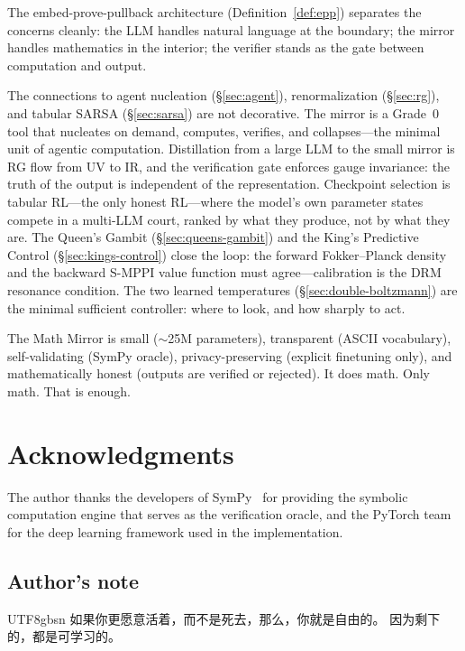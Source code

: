 \documentclass[11pt,a4paper]{article}
\begin{document}
The embed-prove-pullback architecture
(Definition~\ref{def:epp}) separates the concerns cleanly:
the LLM handles natural language at the boundary;
the mirror handles mathematics in the interior;
the verifier stands as the gate between computation and output.

The connections to agent nucleation (\S\ref{sec:agent}),
renormalization (\S\ref{sec:rg}), and tabular SARSA
(\S\ref{sec:sarsa}) are not decorative.
The mirror is a Grade~0 tool that nucleates on demand,
computes, verifies, and collapses---the minimal unit of
agentic computation.
Distillation from a large LLM to the small mirror is RG flow
from UV to IR, and the verification gate enforces gauge
invariance: the truth of the output is independent of the
representation.
Checkpoint selection is tabular RL---the only honest RL---where
the model's own parameter states compete in a multi-LLM court,
ranked by what they produce, not by what they are.
The Queen's Gambit (\S\ref{sec:queens-gambit}) and the
King's Predictive Control (\S\ref{sec:kings-control})
close the loop: the forward Fokker--Planck density and
the backward S-MPPI value function must agree---calibration
is the DRM resonance condition.
The two learned temperatures (\S\ref{sec:double-boltzmann})
are the minimal sufficient controller: where to look, and
how sharply to act.

The Math Mirror is small ($\sim$25M parameters), transparent
(ASCII vocabulary), self-validating (SymPy oracle),
privacy-preserving (explicit finetuning only), and
mathematically honest (outputs are verified or rejected).
It does math. Only math. That is enough.

\section*{Acknowledgments}

The author thanks the developers of SymPy~\cite{Meurer2017}
for providing the symbolic computation engine that serves
as the verification oracle, and the PyTorch team for the
deep learning framework used in the implementation.

\subsection*{Author's note}

\begin{CJK}{UTF8}{gbsn}
如果你更愿意活着，而不是死去，那么，你就是自由的。
因为剩下的，都是可学习的。
\end{CJK}
\end{document}
